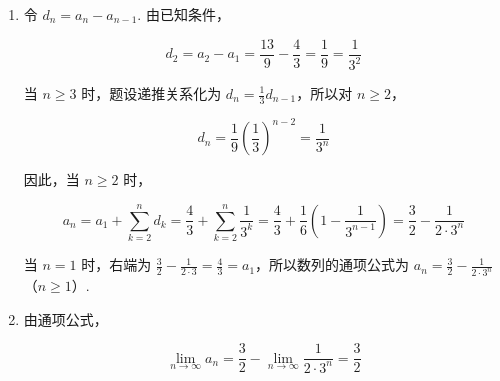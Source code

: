 \documentclass[UTF8,a4paper,oneside,11pt]{ctexbook}
\begin{document}
\begin{solution}
\begin{enumerate}
\item 令 \(d_n=a_n-a_{n-1}\). 由已知条件，

\[
d_2=a_2-a_1=\frac{13}{9}-\frac{4}{3}=\frac{1}{9}=\frac{1}{3^2}
\]

当 \(n\geqslant3\) 时，题设递推关系化为 \(d_n=\frac{1}{3}d_{n-1}\)，所以对 \(n\geqslant2\)，

\[
d_n=\frac{1}{9}\left(\frac{1}{3}\right)^{n-2}=\frac{1}{3^n}
\]

因此，当 \(n\geqslant2\) 时，

\[
a_n=a_1+\sum_{k=2}^{n}d_k=\frac{4}{3}+\sum_{k=2}^{n}\frac{1}{3^k}=\frac{4}{3}+\frac{1}{6}\left(1-\frac{1}{3^{n-1}}\right)=\frac{3}{2}-\frac{1}{2\cdot3^n}
\]

当 \(n=1\) 时，右端为 \(\frac{3}{2}-\frac{1}{2\cdot3}=\frac{4}{3}=a_1\)，所以数列的通项公式为 \(a_n=\frac{3}{2}-\frac{1}{2\cdot3^n}\)（\(n\geqslant1\)）.

\item 由通项公式，

\[
\displaystyle\lim_{n\to\infty}a_n=\frac{3}{2}-\displaystyle\lim_{n\to\infty}\frac{1}{2\cdot3^n}=\frac{3}{2}
\]
\end{enumerate}
\end{solution}

\end{document}

